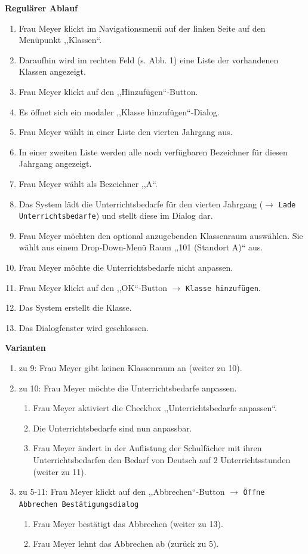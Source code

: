 \documentclass[fontsize=12pt,paper=a4,twoside]{scrartcl}
\begin{document}
\textbf{Regulärer Ablauf}
\begin{enumerate}
\item Frau Meyer klickt im Navigationsmenü auf der linken Seite auf den Menüpunkt ,,Klassen``.
\item Daraufhin wird im rechten Feld (s. Abb. 1) eine Liste der vorhandenen Klassen angezeigt.
\item Frau Meyer klickt auf den ,,Hinzuf\"ugen``-Button.
\item Es öffnet sich ein modaler ,,Klasse hinzufügen``-Dialog.
\item Frau Meyer wählt in einer Liste den vierten Jahrgang aus. 
\item In einer zweiten Liste werden alle noch verfügbaren Bezeichner für diesen Jahrgang angezeigt.
\item Frau Meyer wählt als Bezeichner ,,A``.
\item Das System lädt die  Unterrichtsbedarfe für den vierten Jahrgang ($\rightarrow$ \texttt{Lade Unterrichtsbedarfe}) und stellt diese im Dialog dar.
\item Frau Meyer möchten den optional anzugebenden Klassenraum auswählen. Sie wählt aus einem Drop-Down-Menü Raum ,,101 (Standort A)`` aus.
\item Frau Meyer möchte die Unterrichtsbedarfe nicht anpassen.
\item Frau Meyer klickt auf den ,,OK``-Button $\rightarrow$ \texttt{Klasse hinzufügen}.
\item Das System erstellt die Klasse. 
\item Das Dialogfenster wird geschlossen.
\end{enumerate}
\vspace{5pt}


\textbf{Varianten}
\begin{enumerate}
\item zu 9: Frau Meyer gibt keinen Klassenraum an (weiter zu 10). 
\item zu 10: Frau Meyer möchte die Unterrichtsbedarfe anpassen.
	\begin{enumerate}[label={\arabic*.}]
	\item Frau Meyer aktiviert die Checkbox ,,Unterrichtsbedarfe anpassen``.
	\item Die Unterrichtsbedarfe sind nun anpassbar.
	\item Frau Meyer ändert in der Auflistung der Schulfächer mit ihren Unterrichtsbedarfen den Bedarf von Deutsch auf 2 Unterrichtsstunden (weiter zu 11).
	\end{enumerate}
\item zu 5-11: Frau Meyer klickt auf den ,,Abbrechen``-Button $\rightarrow$ \texttt{Öffne Abbrechen Bestätigungsdialog}
	\begin{enumerate}[label={\alph*.}]
	\item Frau Meyer bestätigt das Abbrechen (weiter zu 13).
	\item Frau Meyer lehnt das Abbrechen ab (zurück zu 5).
	\end{enumerate}
\end{enumerate}
\vspace{5pt}
\end{document}
